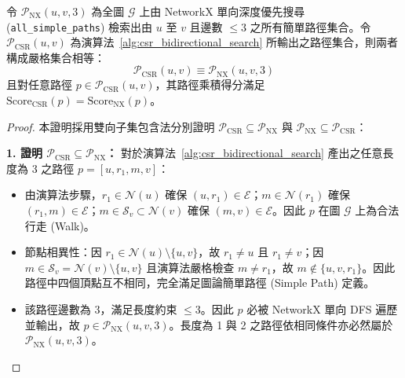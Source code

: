 \begin{proposition}[路徑集合與分數等價性]
令 $\mathcal{P}_{\text{NX}}(u, v, 3)$ 為全圖 $\mathcal{G}$ 上由 NetworkX 單向深度優先搜尋 (\texttt{all\_simple\_paths}) 檢索出由 $u$ 至 $v$ 且邊數 $\le 3$ 之所有簡單路徑集合。令 $\mathcal{P}_{\text{CSR}}(u, v)$ 為演算法~\ref{alg:csr_bidirectional_search} 所輸出之路徑集合，則兩者構成嚴格集合相等：
\begin{equation}
  \mathcal{P}_{\text{CSR}}(u, v) \equiv \mathcal{P}_{\text{NX}}(u, v, 3)
\end{equation}
且對任意路徑 $p \in \mathcal{P}_{\text{CSR}}(u, v)$，其路徑乘積得分滿足 $\text{Score}_{\text{CSR}}(p) = \text{Score}_{\text{NX}}(p)$。
\end{proposition}

\begin{proof}
本證明採用雙向子集包含法分別證明 $\mathcal{P}_{\text{CSR}} \subseteq \mathcal{P}_{\text{NX}}$ 與 $\mathcal{P}_{\text{NX}} \subseteq \mathcal{P}_{\text{CSR}}$：

\textbf{1. 證明 $\mathcal{P}_{\text{CSR}} \subseteq \mathcal{P}_{\text{NX}}$：}
對於演算法~\ref{alg:csr_bidirectional_search} 產出之任意長度為 3 之路徑 $p = [u, r_1, m, v]$：
\begin{itemize}[leftmargin=2em]
  \item 由演算法步驟，$r_1 \in \mathcal{N}(u)$ 確保 $(u, r_1) \in \mathcal{E}$；$m \in \mathcal{N}(r_1)$ 確保 $(r_1, m) \in \mathcal{E}$；$m \in \mathcal{S}_v \subset \mathcal{N}(v)$ 確保 $(m, v) \in \mathcal{E}$。因此 $p$ 在圖 $\mathcal{G}$ 上為合法行走 (Walk)。
  \item 節點相異性：因 $r_1 \in \mathcal{N}(u) \setminus \{u, v\}$，故 $r_1 \ne u$ 且 $r_1 \ne v$；因 $m \in \mathcal{S}_v = \mathcal{N}(v) \setminus \{u, v\}$ 且演算法嚴格檢查 $m \ne r_1$，故 $m \notin \{u, v, r_1\}$。因此路徑中四個頂點互不相同，完全滿足圖論簡單路徑 (Simple Path) 定義。
  \item 該路徑邊數為 3，滿足長度約束 $\le 3$。因此 $p$ 必被 NetworkX 單向 DFS 遍歷並輸出，故 $p \in \mathcal{P}_{\text{NX}}(u, v, 3)$。長度為 1 與 2 之路徑依相同條件亦必然屬於 $\mathcal{P}_{\text{NX}}(u, v, 3)$。
\end{itemize}


\end{proof}
